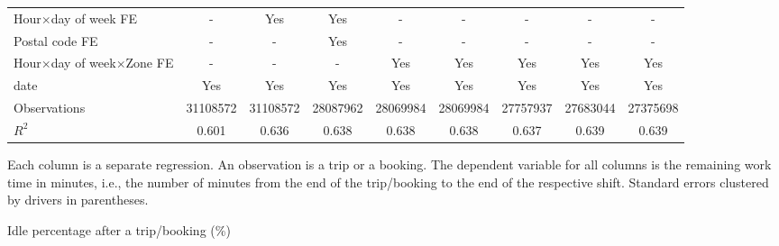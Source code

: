 \documentclass[reviewmode,AEJ]{AEA}
\begin{document}
\begin{appendices}
\begin{table}
{\begin{tabular}{l*{8}{S}}
            \addlinespace
            Hour\(\times\)day of week FE&         {-}         &       {Yes}         &       {Yes}         &         {-}         &         {-}         &         {-}         &         {-}         &         {-}         \\
            \addlinespace
            Postal code FE      &         {-}         &         {-}         &       {Yes}         &         {-}         &         {-}         &         {-}         &         {-}         &         {-}         \\
            \addlinespace
            Hour\(\times\)day of week\(\times\)Zone FE&         {-}         &         {-}         &         {-}         &       {Yes}         &       {Yes}         &       {Yes}         &       {Yes}         &       {Yes}         \\
            \addlinespace
            date                &       {Yes}         &       {Yes}         &       {Yes}         &       {Yes}         &       {Yes}         &       {Yes}         &       {Yes}         &       {Yes}         \\
            \midrule
            Observations        &\num{31108572}         &\num{31108572}         &\num{28087962}         &\num{28069984}         &\num{28069984}         &\num{27757937}         &\num{27683044}         &\num{27375698}         \\
            \(R^2\)             &     {0.601}         &     {0.636}         &     {0.638}         &     {0.638}         &     {0.638}         &     {0.637}         &     {0.639}         &     {0.639}         \\
            \bottomrule
            \end{tabular}
            }
 			\begin{tablenotes}
 				Each column is a separate regression. An observation is a trip or a booking. The dependent variable for all columns is the remaining work time in  minutes, i.e., the number of minutes from the end of the trip/booking to the end of the respective shift. Standard errors clustered by drivers in parentheses. 
 			\end{tablenotes}
 	\end{table}



\FloatBarrier

	\begin{table}[h]
 		\centering
 		\caption{Idle percentage after a trip/booking (\%)}
 		\label{tb:robustidle}
		

\end{table}
\end{appendices}
\end{document}
